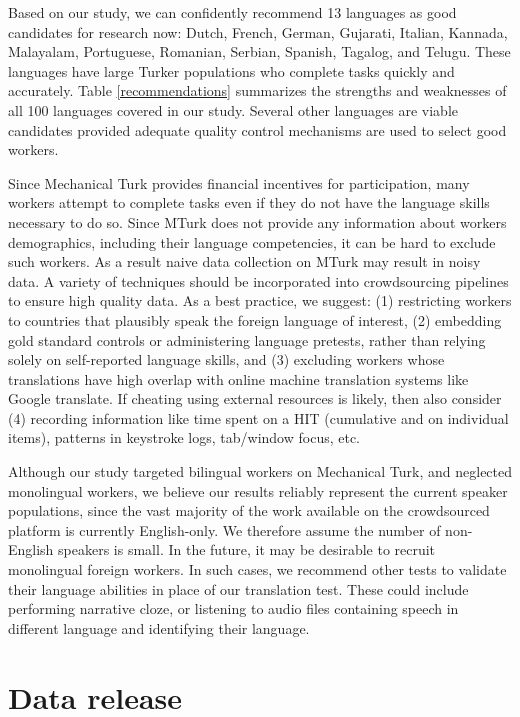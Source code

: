 \documentclass[11pt]{article}
\begin{document}
Based on our study, we can confidently recommend 13 languages as good candidates for research now: Dutch, French, German, Gujarati, Italian, Kannada, Malayalam, Portuguese, Romanian, Serbian, Spanish, Tagalog, and Telugu. These languages have large Turker populations who complete tasks quickly and accurately. Table \ref{recommendations} summarizes the strengths and weaknesses of all 100 languages covered in our study.  Several other languages are viable candidates provided adequate quality control mechanisms are used to select good workers.

Since Mechanical Turk provides financial incentives for participation, many workers attempt to complete tasks even if they do not have the language skills necessary to do so.  Since MTurk does not provide any information about workers demographics, including their language competencies, it can be hard to exclude such workers.  As a result naive data collection on MTurk may result in noisy data.  A variety of techniques should be incorporated into crowdsourcing pipelines to ensure high quality data.  As a best practice, we suggest: (1) restricting workers to countries that plausibly speak the foreign language of interest, (2) embedding gold standard controls or administering language pretests, rather than relying solely on self-reported language skills, and (3) excluding workers whose translations have high overlap with online machine translation systems like Google translate.  If cheating using external resources is likely, then also consider (4) recording information like time spent on a HIT (cumulative and on individual items), patterns in keystroke logs, tab/window focus, etc.

Although our study targeted bilingual workers on Mechanical Turk, and neglected monolingual workers, we believe our results reliably represent the current speaker populations, since the vast majority of the work available on the crowdsourced platform is currently English-only.  We therefore assume the number of non-English speakers is small.  In the future, it may be desirable to recruit monolingual foreign workers.  In such cases, we recommend other tests to validate their language abilities in place of our translation test.  These could include performing narrative cloze, or listening to audio files containing speech in different language and identifying their language. 



\section{Data release}
\end{document}
